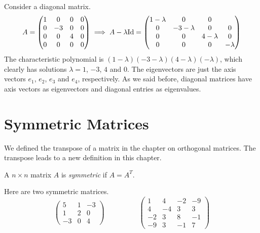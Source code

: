 \documentclass[fleqn]{report}
\begin{document}
\begin{example}
Consider a diagonal matrix.
\begin{equation*}
A = \left( \begin{matrix}
1 & 0 & 0 & 0 \\ 0 & -3 & 0 & 0 \\ 0 & 0 & 4 & 0 \\ 0 & 0 & 0
& 0 
\end{matrix} \right)
\implies A - \lambda \mathrm{Id} = 
\left( \begin{matrix}
1 - \lambda & 0 & 0 & \\ 0 & -3 - \lambda & 0 & 0 \\ 0 & 0 &
4 - \lambda & 0 \\ 0 & 0 & 0 & - \lambda
\end{matrix} \right)
\end{equation*}
The characteristic polynomial is
$(1-\lambda)(-3-\lambda)(4-\lambda)(-\lambda)$, which clearly
has solutions $\lambda = 1$, $-3$, $4$ and $0$. The
eigenvectors are just the axis vectors $e_1$, $e_2$, $e_3$ and
$e_4$, respectively. As we said before, diagonal matrices have
axis vectors as eigenvectors and diagonal entries as
eigenvalues. 
\end{example}

\section{Symmetric Matrices}

We defined the transpose of a matrix in the chapter on
orthogonal matrices. The transpose leads to a new definition
in this chapter.

\begin{defn}
A $n \times n$ matrix $A$ is \emph{symmetric} if $A = A^T$.
\end{defn}

\begin{example}
Here are two symmetric matrices.
\begin{displaymath}
\left(
\begin{matrix}
5 & 1 & -3 \\
1 & 2 & 0 \\
-3 & 0 & 4 
\end{matrix}
\right)
\hspace{2cm}
\left(
\begin{matrix}
1 & 4 & -2 & -9 \\
4 & -4 & 3 & 3 \\
-2 & 3 & 8 & -1 \\
-9 & 3 & -1 & 7 
\end{matrix}
\right)
\end{displaymath}
\end{example}
\end{document}
